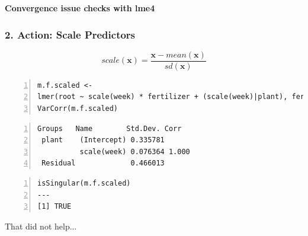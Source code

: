\documentclass{beamer}
\newenvironment{VerbatimIN}
 {\VerbatimEnvironment
  \begin{tcolorbox}[
    breakable,
    colback=lightgray,
    spartan
  ]%
  \begin{Verbatim}}
 {\end{Verbatim}\end{tcolorbox}}
\newenvironment{VerbatimOUT}
 {\VerbatimEnvironment
  \begin{tcolorbox}[
    breakable,
    spartan
  ]%
  \begin{Verbatim}}
 {\end{Verbatim}\end{tcolorbox}}
\begin{document}
\begin{frame}[fragile]
    \huge\color{purple}\textbf{Convergence issue checks with lme4}
\end{frame}


\begin{frame}[fragile]
    \frametitle{2. Action: Scale Predictors}
    \begin{equation*}
        scale(\mathbf{x}) = \frac{\mathbf{x} - mean(\mathbf{x})}{sd(\mathbf{x})}
    \end{equation*}
    \vspace{0.3cm}
    
    \scriptsize
    \begin{Verbatim}[numbers=left,numbersep=6pt,frame=single]
m.f.scaled <- 
lmer(root ~ scale(week) * fertilizer + (scale(week)|plant), fertilizer)
VarCorr(m.f.scaled) 
    \end{Verbatim}
    \begin{Verbatim}[numbers=left,numbersep=6pt,frame=single]
 Groups   Name        Std.Dev. Corr 
 plant    (Intercept) 0.335781      
          scale(week) 0.076364 1.000
 Residual             0.466013
    \end{Verbatim}

    \begin{Verbatim}[numbers=left,numbersep=6pt,frame=single]
isSingular(m.f.scaled)
---
[1] TRUE
    \end{Verbatim}
    \normalsize That did not help...
\end{frame}
\end{document}
